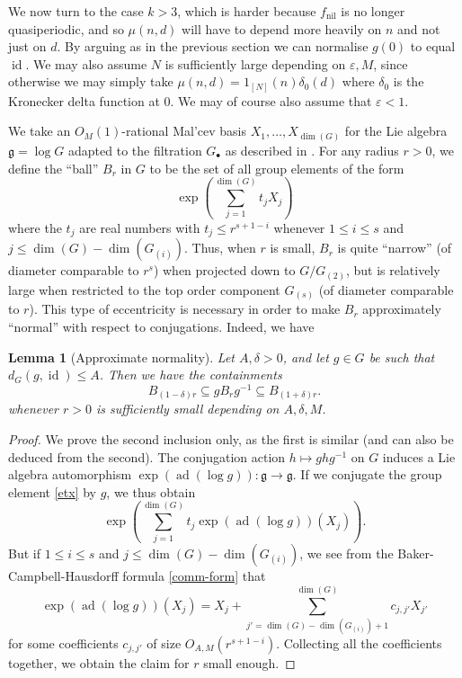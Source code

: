 \documentclass[11pt,reqno]{amsart}
\numberwithin{equation}{section}
\theoremstyle{plain}
\newtheorem{lemma}[subsection]{Lemma}
\theoremstyle{definition}
\renewcommand{\leq}{\leqslant}
\newcommand\1{{\bf 1}}
\newcommand\2{{\bf 2}}
\newcommand\eps{\varepsilon}
\newcommand\id{\operatorname{id}}
\newcommand\nil{{\operatorname{nil}}}
\begin{document}
We now turn to the case $k>3$, which is harder because $f_\nil$ is no longer quasiperiodic, and so $\mu(n,d)$ will have to depend more heavily on $n$ and not just on $d$.
By arguing as in the previous section we can normalise $g(0)$ to equal $\id$.  We may also assume $N$ is sufficiently large depending on $\eps, M$, since otherwise we may simply take $\mu(n,d) = 1_{[N]}(n) \delta_0(d)$ where $\delta_0$ is the Kronecker delta function at $0$.  We may of course also assume that $\eps < 1$.

We take an $O_M(1)$-rational Mal'cev basis $X_1,\dots, X_{\dim(G)}$ for the Lie algebra ${\mathfrak g} = \log G$ adapted to the filtration $G_{\bullet}$ as described in \cite[Appendix A]{green-tao-nilratner}. For any radius $r>0$, we define the ``ball'' $B_r$ in $G$ to be the set of all group elements of the form
\begin{equation}\label{etx}
 \exp( \sum_{j=1}^{\dim(G)} t_j X_j )
\end{equation}
where the $t_j$ are real numbers with $t_j \leq r^{s+1-i}$
whenever $1 \leq i \leq s$ and $j \leq \dim(G)-\dim(G_{(i)})$.   Thus, when $r$ is small, $B_r$ is quite ``narrow'' (of diameter comparable to $r^s$) when projected down to $G/G_{(2)}$, but is relatively large when restricted to the top order component $G_{(s)}$ (of diameter comparable to $r$).  This type of eccentricity is necessary in order to make $B_r$ approximately ``normal'' with respect to conjugations.  Indeed, we have

\begin{lemma}[Approximate normality]\label{normal}  Let $A, \delta > 0$, and let $g \in G$ be such that $d_G(g,\id) \leq A$.  Then we have the containments
\begin{equation}\label{bepsr}
 B_{(1-\delta) r} \subseteq g B_r g^{-1} \subseteq B_{(1+\delta) r}.
\end{equation}
whenever $r > 0$ is sufficiently small depending on $A, \delta, M$.
\end{lemma}

\begin{proof}  We prove the second inclusion only, as the first is similar (and can also be deduced from the second).  The conjugation action $h \mapsto ghg^{-1}$ on $G$ induces a Lie algebra automorphism $\exp(\operatorname{ad}(\log g)): {\mathfrak g} \to {\mathfrak g}$.  If we conjugate the group element \eqref{etx} by $g$, we thus obtain
$$
 \exp( \sum_{j=1}^{\dim(G)} t_j \exp(\operatorname{ad}(\log g))(X_j) ).$$
 But if $1 \leq i \leq s$ and $j \leq \dim(G)-\dim(G_{(i)})$, we see from the Baker-Campbell-Hausdorff formula \eqref{comm-form} that
$$ \exp(\operatorname{ad}(\log g))(X_j) = X_j + \sum_{j'=\dim(G)-\dim(G_{(i)})+1}^{\dim(G)} c_{j,j'} X_{j'}$$
for some coefficients $c_{j,j'}$ of size $O_{A,M}( r^{s+1-i} )$.  Collecting all the coefficients together, we obtain the claim for $r$ small enough.
\end{proof}
\end{document}

